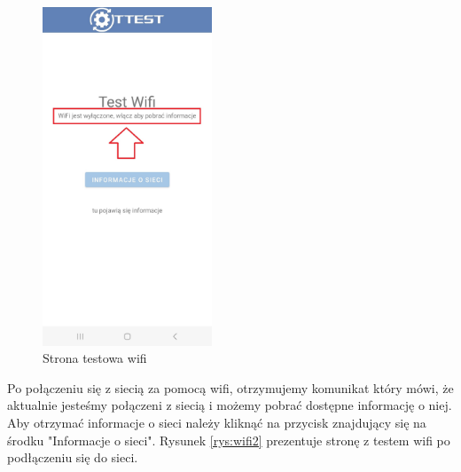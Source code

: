 \begin{figure}[!hbt]
	\begin{center}
		\includegraphics[angle=360, width=0.45\textwidth]{rys/punkt6/wifi1}
		\caption{Strona testowa wifi}
		\label{rys:wifi1}
	\end{center}
\end{figure}

\newpage


Po połączeniu się z siecią za pomocą wifi, otrzymujemy komunikat który mówi, że aktualnie jesteśmy połączeni z siecią i możemy pobrać dostępne informację o niej. Aby otrzymać informacje o sieci należy kliknąć na przycisk znajdujący się na środku "Informacje o sieci". Rysunek \ref{rys:wifi2} prezentuje stronę z testem wifi po podłączeniu się do sieci.

